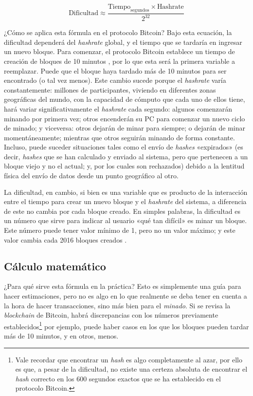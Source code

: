 \documentclass[12pt,a4paper,twoside]{book}
\begin{document}
\begin{equation}
\label{F-Dificultad}
\text{Dificultad} \approx \dfrac{\text{Tiempo}_{\text{segundos}} \times \text{Hashrate}}{2^{32}}
\end{equation}

¿Cómo se aplica esta fórmula en el protocolo Bitcoin? Bajo esta ecuación, la dificultad dependerá del \textit{hashrate} global, y el tiempo que se tardaría en ingresar un nuevo bloque. Para comenzar, el protocolo Bitcoin establece un tiempo de creación de bloques de 10 minutos \cite[pág. 3]{bitcoin:wpaper}, por lo que esta será la primera variable a reemplazar. Puede que el bloque haya tardado más de 10 minutos para ser encontrado (o tal vez menos). Este cambio sucede porque el \textit{hashrate} varía constantemente: millones de participantes, viviendo en diferentes zonas geográficas del mundo, con la capacidad de cómputo que cada uno de ellos tiene, hará variar significativamente el \textit{hashrate} cada segundo: algunos comenzarán minando por primera vez; otros encenderán su PC para comenzar un nuevo ciclo de minado; y viceversa: otros dejarán de minar para siempre; o dejarán de minar momentáneamente; mientras que otros seguirán minando de forma constante. Incluso, puede suceder situaciones tales como el envío de \textit{hashes} «expirados» (es decir, \textit{hashes} que se han calculado y enviado al sistema, pero que pertenecen a un bloque viejo y no el actual; y, por los cuales son rechazados) debido a la lentitud física del envío de datos desde un punto geográfico al otro.

La dificultad, en cambio, si bien es una variable que es producto de la interacción entre el tiempo para crear un nuevo bloque y el \textit{hashrate} del sistema, a diferencia de este no cambia por cada bloque creado. En simples palabras, la dificultad es un número que sirve para indicar al usuario «qué tan difícil» es minar un bloque. Este número puede tener valor mínimo de 1, pero no un valor máximo; y este valor cambia cada 2016 bloques creados \cite{bitwiki:dificultad}.

\subsection{Cálculo matemático}
¿Para qué sirve esta fórmula en la práctica? Esto es simplemente una guía para hacer estimaciones, pero no es algo en lo que realmente se deba tener en cuenta a la hora de hacer transacciones, sino más bien para el \textit{minado}. Si se revisa la \textit{blockchain} de Bitcoin, habrá discrepancias con los números previamente establecidos\footnote{Vale recordar que encontrar un \textit{hash} es algo completamente al azar, por ello es que, a pesar de la dificultad, no existe una certeza absoluta de encontrar el \textit{hash} correcto en los 600 segundos exactos que se ha establecido en el protocolo Bitcoin.} por ejemplo, puede haber casos en los que los bloques pueden tardar más de 10 minutos, y en otros, menos.
\end{document}
